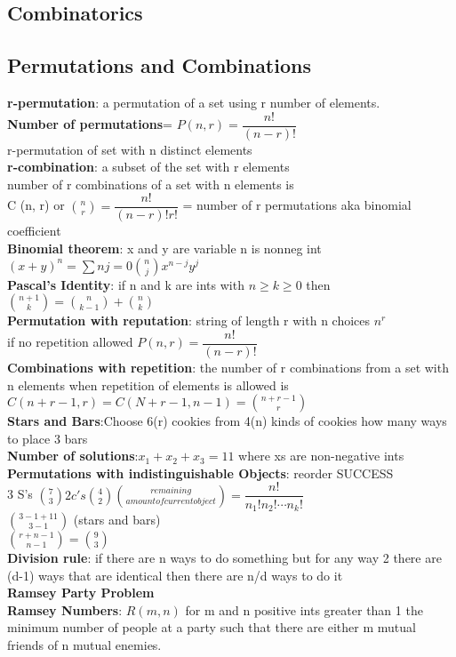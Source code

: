 \documentclass[a4paper]{article}
\begin{document}
\begin{multicols}{2}
	\section{Combinatorics}
	\subsection{Permutations and Combinations}
	\textbf{r-permutation}: a permutation of a set using r number of
	elements.\\
	\textbf{Number of permutations}= $P(n,r)=\dfrac{n!}{(n-r)!}$\\r-permutation
	of set with n distinct elements\\
	\textbf{r-combination}: a subset of the set with r elements\\
	number of r combinations of a set with n elements is\\
	C (n, r) or
	$\binom{n}{r}=\dfrac{n!}{(n-r)!r!}$ = number of r permutations
	aka binomial coefficient\\
	\textbf{Binomial theorem}: x and y are variable n is nonneg int\\
	${(x+y)}^{n}=\sum{n}{j=0}\binom{n}{j}x^{n-j}y^{j}$\\
	\textbf{Pascal's Identity}: if n and k are ints with $n \geq k \geq 0$ then
	\\
	$\binom{n+1}{k}=\binom{n}{k-1}+\binom{n}{k}$\\
	\textbf{Permutation with reputation}: string of length r with n choices
	$n^r$\\
	if no repetition allowed $P(n,r)=\dfrac{n!}{(n-r)!}$\\
	\textbf{Combinations with repetition}: the number of r combinations from a
	set with n elements when repetition of elements is allowed is\\
	$C(n+r-1,r)=C(N+r-1,n-1)=\binom{n+r-1}{r}$\\
	\textbf{Stars and Bars}:Choose 6(r) cookies from 4(n) kinds of cookies how
	many ways to place 3 bars\\
	\textbf{Number of solutions}:$x_1+x_2+x_3=11$ where xs are non-negative
	ints\\
	\textbf{Permutations with indistinguishable Objects}: reorder SUCCESS\\
	3 S's $\binom{7}{3} 2 c's \binom{4}{2} \binom{remaining}{amount of current object}=\dfrac{n!}{n_1!n_2!\cdots n_k!}$\\
	$\binom{3-1+11}{3-1}$ (stars and bars)\\
	$\binom{r+n-1}{n-1}=\binom{9}{3}$\\
	\textbf{Division rule}: if there are n ways to do something but for any way
	2 there are (d-1) ways that are identical then there are n/d ways to do it
	\\
	\textbf{Ramsey Party Problem\\
	Ramsey Numbers}: $R (m,n)$ for m and n positive ints greater than 1 the
	minimum number of people at a party such that there are either m mutual
	friends of n mutual enemies.

\end{multicols}
\end{document}
